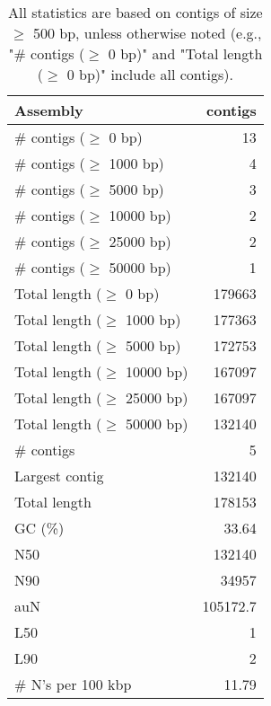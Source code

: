 \documentclass[12pt,a4paper]{article}
\begin{document}
\begin{table}[ht]
\begin{center}
\caption{All statistics are based on contigs of size $\geq$ 500 bp, unless otherwise noted (e.g., "\# contigs ($\geq$ 0 bp)" and "Total length ($\geq$ 0 bp)" include all contigs).}
\begin{tabular}{|l*{1}{|r}|}
\hline
Assembly & contigs \\ \hline
\# contigs ($\geq$ 0 bp) & 13 \\ \hline
\# contigs ($\geq$ 1000 bp) & 4 \\ \hline
\# contigs ($\geq$ 5000 bp) & 3 \\ \hline
\# contigs ($\geq$ 10000 bp) & 2 \\ \hline
\# contigs ($\geq$ 25000 bp) & 2 \\ \hline
\# contigs ($\geq$ 50000 bp) & 1 \\ \hline
Total length ($\geq$ 0 bp) & 179663 \\ \hline
Total length ($\geq$ 1000 bp) & 177363 \\ \hline
Total length ($\geq$ 5000 bp) & 172753 \\ \hline
Total length ($\geq$ 10000 bp) & 167097 \\ \hline
Total length ($\geq$ 25000 bp) & 167097 \\ \hline
Total length ($\geq$ 50000 bp) & 132140 \\ \hline
\# contigs & 5 \\ \hline
Largest contig & 132140 \\ \hline
Total length & 178153 \\ \hline
GC (\%) & 33.64 \\ \hline
N50 & 132140 \\ \hline
N90 & 34957 \\ \hline
auN & 105172.7 \\ \hline
L50 & 1 \\ \hline
L90 & 2 \\ \hline
\# N's per 100 kbp & 11.79 \\ \hline
\end{tabular}
\end{center}
\end{table}
\end{document}
